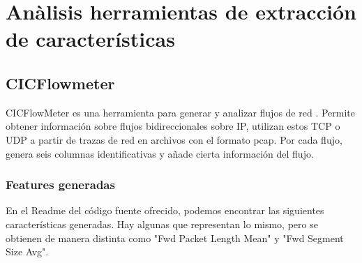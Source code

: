 \section{Anàlisis herramientas de extracción de características}

\subsection{CICFlowmeter}

CICFlowMeter es una herramienta para generar y analizar flujos de red \cite{cicflowpost} \cite{icissp17} \cite{cicflowrepo}. Permite obtener información sobre flujos bidireccionales sobre IP, utilizan estos TCP o UDP a partir de trazas de red en archivos con el formato pcap. Por cada flujo, genera seis columnas identificativas y añade cierta información del flujo. 

\subsubsection{Features generadas}

En el Readme del código fuente ofrecido, podemos encontrar las siguientes características generadas. Hay algunas que representan lo mismo, pero se obtienen de manera distinta como "Fwd Packet Length Mean" y "Fwd Segment Size Avg".


